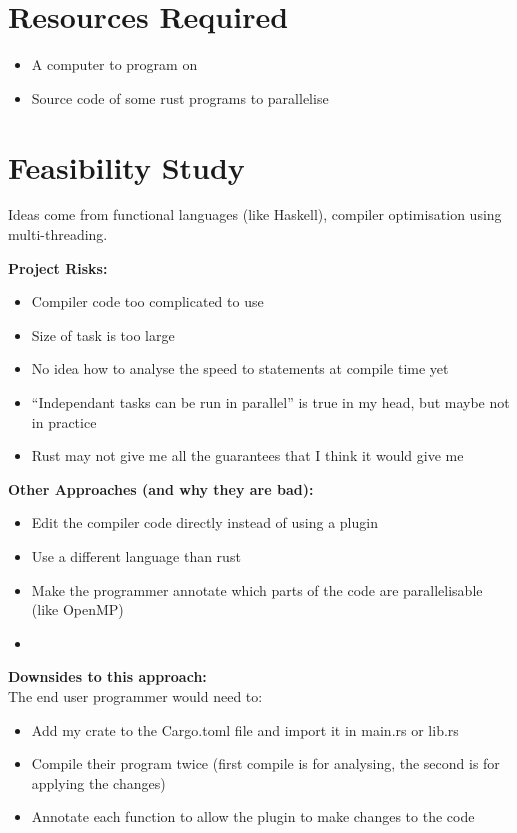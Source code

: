 \documentclass[12pt, a4paper]{article}
\begin{document}
\section{Resources Required}
\begin{itemize}
	\item A computer to program on
	\item Source code of some rust programs to parallelise
\end{itemize}

\section{Feasibility Study}
Ideas come from functional languages (like Haskell), compiler optimisation using multi-threading.

\textbf{Project Risks:}
\begin{itemize}
	\item Compiler code too complicated to use
	\item Size of task is too large
	\item No idea how to analyse the speed to statements at compile time yet
	\item ``Independant tasks can be run in parallel'' is true in my head, but maybe not in practice
	\item Rust may not give me all the guarantees that I think it would give me

\end{itemize}

\textbf{Other Approaches (and why they are bad):}
\begin{itemize}
	\item Edit the compiler code directly instead of using a plugin
	\item Use a different language than rust
	\item Make the programmer annotate which parts of the code are parallelisable (like OpenMP)
	\item

\end{itemize}

\textbf{Downsides to this approach:}\\
The end user programmer would need to:
\begin{itemize}
	\item Add my crate to the Cargo.toml file and import it in main.rs or lib.rs
	\item Compile their program twice (first compile is for analysing, the second is for applying the changes)
	\item Annotate each function to allow the plugin to make changes to the code
\end{itemize}
\end{document}
